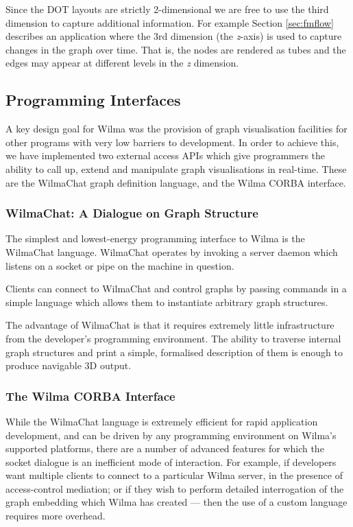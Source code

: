 \documentclass[runningheads]{cl2emult}
\begin{document}
Since the DOT layouts are strictly 2-dimensional we are free to use the
third dimension to capture additional information.  For example
Section \ref{sec:fmflow} describes an application where the 3rd
dimension (the {\em z}-axis) is used to capture changes in the graph over time.
That is, the nodes are rendered as tubes and the edges may appear at different
levels in the {\em z} dimension.

\subsection{Programming Interfaces}
\label{API}

A key design goal for Wilma was the provision of graph visualisation
facilities for other programs with very low barriers to development.  In order
to achieve this, we have implemented two external access APIs which give
programmers the ability to call up, extend and manipulate graph visualisations
in real-time.  These are the WilmaChat graph definition language, and the
Wilma CORBA interface.

\subsubsection{WilmaChat: A Dialogue on Graph Structure}

The simplest and lowest-energy programming interface to Wilma is the WilmaChat
language.  WilmaChat operates by invoking a server daemon which listens on a
socket or pipe on the machine in question.

Clients can connect to WilmaChat and control graphs by passing commands
in a simple language which allows them to instantiate arbitrary graph
structures.

The advantage of WilmaChat is that it requires extremely little infrastructure
from the developer's programming environment.  The ability to traverse
internal graph structures and print a simple, formalised description of them
is enough to produce navigable 3D output.

\subsubsection{The Wilma CORBA Interface}

While the WilmaChat language is extremely efficient for rapid application
development, and can be driven by any programming environment on Wilma's
supported platforms, there are a number of advanced features for which the
socket dialogue is an inefficient mode of interaction.  For example, if
developers want multiple clients to connect to a particular Wilma server, in
the presence of access-control mediation; or if they wish to perform detailed
interrogation of the graph embedding which Wilma has created --- then the use
of a custom language requires more overhead.
\end{document}
